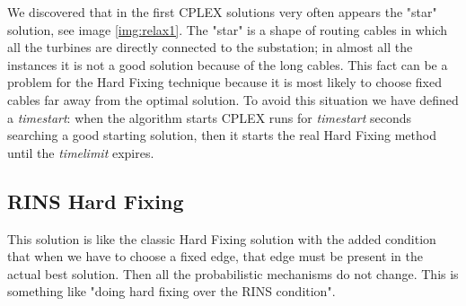 We discovered that in the first \textsc{CPLEX} solutions very often appears the "star" solution, see image \ref{img:relax1}. The "star" is a shape of routing cables in which all the turbines are directly connected to the substation; in almost all the instances it is not a good solution because of the long cables. This fact can be a problem for the Hard Fixing technique because it is most likely to choose fixed cables far away from the optimal solution. To avoid this situation we have defined a \textit{timestart}: when the algorithm starts \textsc{CPLEX} runs for \textit{timestart} seconds searching a good starting solution, then it starts the real Hard Fixing method until the \textit{timelimit} expires. 

\subsection{RINS Hard Fixing}
This solution is like the classic Hard Fixing solution with the added condition that when we have to choose a fixed edge, that edge must be present in the actual best solution. Then all the probabilistic mechanisms do not change. This is something like "doing hard fixing over the RINS condition". 


